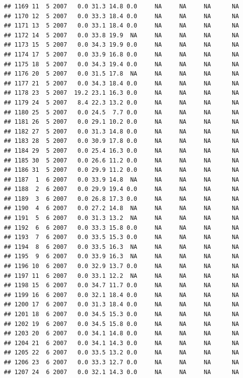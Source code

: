 \documentclass[
]{book}
\begin{document}
\begin{verbatim}
## 1169 11  5 2007   0.0 31.3 14.8 0.0     NA     NA     NA      NA
## 1170 12  5 2007   0.0 33.3 18.4 0.0     NA     NA     NA      NA
## 1171 13  5 2007   0.0 33.1 18.4 0.0     NA     NA     NA      NA
## 1172 14  5 2007   0.0 33.8 19.9  NA     NA     NA     NA      NA
## 1173 15  5 2007   0.0 34.3 19.9 0.0     NA     NA     NA      NA
## 1174 17  5 2007   0.0 33.9 16.8 0.0     NA     NA     NA      NA
## 1175 18  5 2007   0.0 34.3 19.4 0.0     NA     NA     NA      NA
## 1176 20  5 2007   0.0 31.5 17.8  NA     NA     NA     NA      NA
## 1177 21  5 2007   0.0 34.3 18.4 0.0     NA     NA     NA      NA
## 1178 23  5 2007  19.2 23.1 16.3 0.0     NA     NA     NA      NA
## 1179 24  5 2007   8.4 22.3 13.2 0.0     NA     NA     NA      NA
## 1180 25  5 2007   0.0 24.5  7.7 0.0     NA     NA     NA      NA
## 1181 26  5 2007   0.0 29.1 10.2 0.0     NA     NA     NA      NA
## 1182 27  5 2007   0.0 31.3 14.8 0.0     NA     NA     NA      NA
## 1183 28  5 2007   0.0 30.9 17.8 0.0     NA     NA     NA      NA
## 1184 29  5 2007   0.0 25.4 16.3 0.0     NA     NA     NA      NA
## 1185 30  5 2007   0.0 26.6 11.2 0.0     NA     NA     NA      NA
## 1186 31  5 2007   0.0 29.9 11.2 0.0     NA     NA     NA      NA
## 1187  1  6 2007   0.0 33.9 14.8  NA     NA     NA     NA      NA
## 1188  2  6 2007   0.0 29.9 19.4 0.0     NA     NA     NA      NA
## 1189  3  6 2007   0.0 26.8 17.3 0.0     NA     NA     NA      NA
## 1190  4  6 2007   0.0 27.2 14.8  NA     NA     NA     NA      NA
## 1191  5  6 2007   0.0 31.3 13.2  NA     NA     NA     NA      NA
## 1192  6  6 2007   0.0 33.3 15.8 0.0     NA     NA     NA      NA
## 1193  7  6 2007   0.0 33.5 15.3 0.0     NA     NA     NA      NA
## 1194  8  6 2007   0.0 33.5 16.3  NA     NA     NA     NA      NA
## 1195  9  6 2007   0.0 33.9 16.3  NA     NA     NA     NA      NA
## 1196 10  6 2007   0.0 32.9 13.7 0.0     NA     NA     NA      NA
## 1197 11  6 2007   0.0 33.1 12.2  NA     NA     NA     NA      NA
## 1198 15  6 2007   0.0 34.7 11.7 0.0     NA     NA     NA      NA
## 1199 16  6 2007   0.0 32.1 18.4 0.0     NA     NA     NA      NA
## 1200 17  6 2007   0.0 31.3 18.4 0.0     NA     NA     NA      NA
## 1201 18  6 2007   0.0 34.5 15.3 0.0     NA     NA     NA      NA
## 1202 19  6 2007   0.0 34.5 15.8 0.0     NA     NA     NA      NA
## 1203 20  6 2007   0.0 34.1 14.8 0.0     NA     NA     NA      NA
## 1204 21  6 2007   0.0 34.1 14.3 0.0     NA     NA     NA      NA
## 1205 22  6 2007   0.0 33.5 13.2 0.0     NA     NA     NA      NA
## 1206 23  6 2007   0.0 33.3 12.7 0.0     NA     NA     NA      NA
## 1207 24  6 2007   0.0 32.1 14.3 0.0     NA     NA     NA      NA

\end{verbatim}
\end{document}
